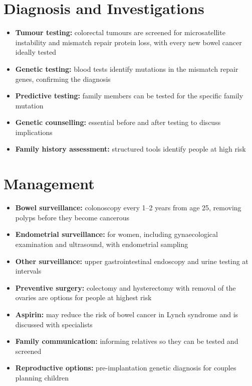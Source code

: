 \section*{Diagnosis and Investigations}
\begin{itemize}
    \item \textbf{Tumour testing:} colorectal tumours are screened for microsatellite instability and mismatch repair protein loss, with every new bowel cancer ideally tested
    \item \textbf{Genetic testing:} blood tests identify mutations in the mismatch repair genes, confirming the diagnosis
    \item \textbf{Predictive testing:} family members can be tested for the specific family mutation
    \item \textbf{Genetic counselling:} essential before and after testing to discuss implications
    \item \textbf{Family history assessment:} structured tools identify people at high risk
\end{itemize}

\section*{Management}
\begin{itemize}
    \item \textbf{Bowel surveillance:} colonoscopy every 1--2 years from age 25, removing polyps before they become cancerous
    \item \textbf{Endometrial surveillance:} for women, including gynaecological examination and ultrasound, with endometrial sampling
    \item \textbf{Other surveillance:} upper gastrointestinal endoscopy and urine testing at intervals
    \item \textbf{Preventive surgery:} colectomy and hysterectomy with removal of the ovaries are options for people at highest risk
    \item \textbf{Aspirin:} may reduce the risk of bowel cancer in Lynch syndrome and is discussed with specialists
    \item \textbf{Family communication:} informing relatives so they can be tested and screened
    \item \textbf{Reproductive options:} pre-implantation genetic diagnosis for couples planning children
\end{itemize}

